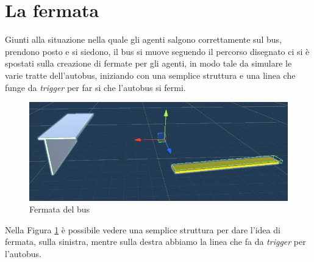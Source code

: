 \documentclass[12pt, openany]{book}
\begin{document}
	\section{La fermata}
	Giunti alla situazione nella quale gli agenti salgono correttamente sul bus, prendono posto e si siedono, il bus si muove seguendo il percorso disegnato ci si è spostati sulla creazione di fermate per gli agenti, in modo tale da simulare le varie tratte dell'autobus, iniziando con una semplice struttura e una linea che funge da \emph{trigger} per far si che l'autobus si fermi.\\
	\begin{figure}[H]
		\centering
		\includegraphics[width=1\linewidth]{"Immagini/BusStopNoSA.png"}
		\caption{Fermata del bus}
		\label{fig:BusStopNoSA}
	\end{figure}
	Nella Figura \ref{fig:BusStopNoSA} è possibile vedere una semplice struttura per dare l'idea di fermata, sulla sinistra, mentre sulla destra abbiamo la linea che fa da \emph{trigger} per l'autobus.\\
	
\end{document}
